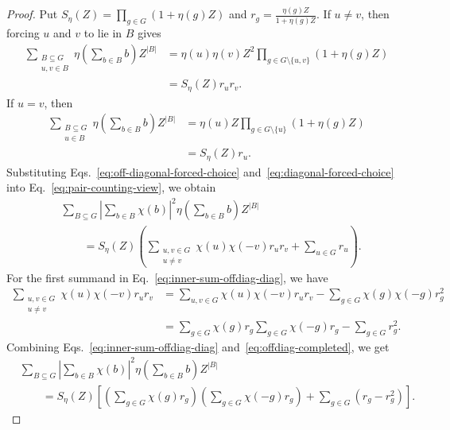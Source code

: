 \documentclass[10pt,a4paper]{amsart}
\begin{document}
\begin{proof}
Put $S_\eta(Z)=\prod_{g\in G}(1+\eta(g)Z)$ and $r_g=\frac{\eta(g)Z}{1+\eta(g)Z}$. If \(u\ne v\), then forcing \(u\) and \(v\) to lie in \(B\) gives
\begin{equation}\label{eq:off-diagonal-forced-choice}
	\begin{aligned}
		\sum_{\substack{B\subseteq G\\ u,v\in B}}
		\eta\left(\sum_{b\in B}b\right)Z^{|B|}
		&=
		\eta(u)\eta(v)Z^2
		\prod_{g\in G\setminus\{u,v\}}(1+\eta(g)Z)  \\
		&=
		S_\eta(Z)r_ur_v.
	\end{aligned}
\end{equation}
If \(u=v\), then 
\begin{equation}\label{eq:diagonal-forced-choice}
	\begin{aligned}
		\sum_{\substack{B\subseteq G\\ u\in B}}
		\eta\left(\sum_{b\in B}b\right)Z^{|B|}
		&=
		\eta(u)Z
		\prod_{g\in G\setminus\{u\}}(1+\eta(g)Z)  \\
		&=
		S_\eta(Z)r_u.
	\end{aligned}
\end{equation}
Substituting Eqs.~\eqref{eq:off-diagonal-forced-choice} and~\eqref{eq:diagonal-forced-choice} into Eq.~\eqref{eq:pair-counting-view}, we obtain
\begin{equation}\label{eq:inner-sum-offdiag-diag}
	\begin{aligned}
		&\sum_{B\subseteq G}
		\left|\sum_{b\in B}\chi(b)\right|^2
		\eta\left(\sum_{b\in B}b\right)Z^{|B|} \\
		&\qquad =
		S_\eta(Z)
		\left(\sum_{\substack{u,v\in G\\ u\ne v}}
		\chi(u)\chi(-v)r_ur_v
		+
		\sum_{u\in G}r_u
		\right).
	\end{aligned}
\end{equation}
For the first summand in Eq.~\eqref{eq:inner-sum-offdiag-diag}, we have
\begin{equation}\label{eq:offdiag-completed}
	\begin{aligned}
		\sum_{\substack{u,v\in G\\ u\ne v}}
		\chi(u)\chi(-v)r_ur_v
		&=
		\sum_{u,v\in G}\chi(u)\chi(-v)r_ur_v
		-
		\sum_{g\in G}\chi(g)\chi(-g)r_g^2  \\
		&=
	\sum_{g\in G}\chi(g)r_g
	\sum_{g\in G}\chi(-g)r_g
		-
		\sum_{g\in G}r_g^2.
	\end{aligned}
\end{equation}
Combining Eqs.~\eqref{eq:inner-sum-offdiag-diag} and~\eqref{eq:offdiag-completed}, we get
\begin{equation}\label{eq:inner-sum-final}
	\begin{aligned}
		&\sum_{B\subseteq G}
		\left|\sum_{b\in B}\chi(b)\right|^2
		\eta\left(\sum_{b\in B}b\right)Z^{|B|} \\
		&\qquad =
		S_\eta(Z)
		\left[
		\left(\sum_{g\in G}\chi(g)r_g\right)
		\left(\sum_{g\in G}\chi(-g)r_g\right)
		+
		\sum_{g\in G}(r_g-r_g^2)
		\right].
	\end{aligned}
	\end{equation}


\end{proof}
\end{document}
